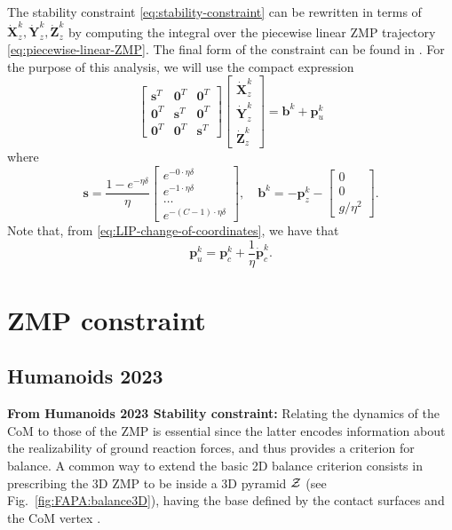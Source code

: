 The stability constraint \eqref{eq:stability-constraint} can be rewritten in 
terms of $\dot{\bm{X}}_z^k, \dot{\bm{Y}}_z^k, \dot{\bm{Z}}_z^k$ by computing
the integral over the piecewise linear ZMP trajectory \eqref{eq:piecewise-linear-ZMP}.
The final form of the constraint can be found in \cite{Scianca2020TRO}.
For the purpose of this analysis, we will use the compact expression
\begin{equation*}
    \label{eq:FAPA:stability-constraint}
    \begin{bmatrix}
        \bm{s}^T & \bm{0}^T & \bm{0}^T \\
        \bm{0}^T & \bm{s}^T & \bm{0}^T \\
        \bm{0}^T & \bm{0}^T & \bm{s}^T
    \end{bmatrix}
    \begin{bmatrix}
        \dot{\bm{X}}_z^k \\ \dot{\bm{Y}}_z^k \\ \dot{\bm{Z}}_z^k
    \end{bmatrix}
    =
    \bm{b}^k + \bm{p}_u^k
\end{equation*}
where
\begin{equation}
    \bm{s} =
    \frac{1-e^{-\eta\delta}}{\eta}
    \begin{bmatrix}
        e^{-0\cdot\eta\delta} \\
        e^{-1\cdot\eta\delta} \\
        \dots \\
        e^{-(C-1)\cdot\eta\delta}
    \end{bmatrix}, \quad
    \bm{b}^k = -\bm{p}_z^k -
    \begin{bmatrix}
        0 \\ 0 \\ g / \eta^2
    \end{bmatrix}.
\end{equation}
Note that, from \ref{eq:LIP-change-of-coordinates}, we have that
\begin{equation}
    \bm{p}_u^k = \bm{p}_c^k + \frac{1}{\eta} \dot{\bm{p}}_c^k.
\end{equation}

\section{ZMP constraint}
\subsection{Humanoids 2023}
\textbf{From Humanoids 2023 Stability constraint:} Relating the dynamics of the CoM to those of the ZMP is essential since the latter encodes information about the realizability of ground reaction forces, and thus provides a criterion for balance. 
A common way to extend the basic 2D balance criterion consists in prescribing the 3D ZMP to be inside a 3D pyramid $\cal Z$ (see Fig.~\ref{fig:FAPA:balance3D}), having the base defined by the contact surfaces and the CoM vertex \cite{Sugihara2002ICRA, Cipriano2023RAS}.


